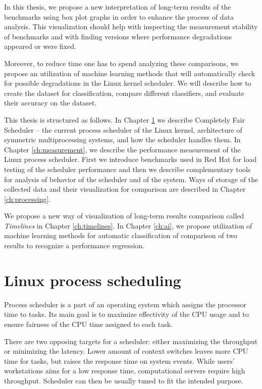 In this thesis, we propose a new interpretation of long-term results of the
benchmarks using box plot graphs in order to enhance the process of data
analysis. This visualization should help with inspecting the measurement
stability of benchmarks and with finding versions where performance degradations
appeared or were fixed.

Moreover, to reduce time one has to spend analyzing these comparisons,
we propose an utilization of machine learning methods that will
automatically check for possible degradations in the Linux kernel scheduler. We will
describe how to create the dataset for classification, compare different
classifiers, and evaluate their accuracy on the dataset.

This thesis is structured as follows. In Chapter \ref{ch:scheduler} we describe
Completely Fair Scheduler -- the current process scheduler of the Linux kernel,
architecture of symmetric multiprocessing systems, and how the scheduler handles
them. In Chapter \ref{ch:measurement}, we describe the performance measurement of
the Linux process scheduler. First we introduce benchmarks used in Red Hat for
load testing of the scheduler performance and then we describe complementary tools for analysis of
behavior of the scheduler and of the system. Ways of storage of the collected data
and their visualization for comparison are described in Chapter
\ref{ch:processing}.

We propose a new way of visualization of long-term results comparison called
\emph{Timelines} in Chapter \ref{ch:timelines}. In Chapter
\ref{ch:ai}, we propose utilization of machine learning methods for automatic
classification of comparison of two results to recognize a performance
regression.



\chapter{Linux process scheduling} \label{ch:scheduler}
Process scheduler is a part of an operating system which assigns the processor
time to tasks. Its main goal is to maximize effectivity of the CPU usage and to
ensure fairness of the CPU time assigned to each task.

There are two opposing targets for a scheduler: either maximizing the throughput or
minimizing the latency. Lower amount of context switches leaves more CPU time for
tasks, but raises the response time on system events.
While users' workstations aims for a low response time, computational servers
require high throughput. Scheduler can then be usually tuned to fit the intended
purpose.

